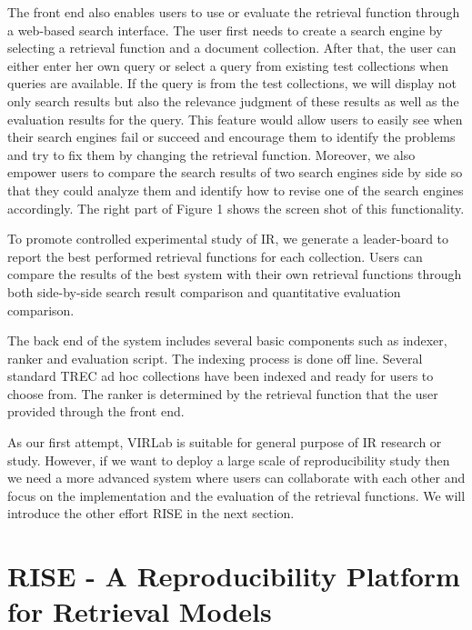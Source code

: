 The front end also enables users to use or evaluate the retrieval 
function through a web-based search interface. The user first needs 
to create a search engine by selecting a retrieval function and a 
document collection. After that, the user can either enter her 
own query or select a query from existing test collections when 
queries are available. If the query is from the test collections, 
we will display not only search results but also the relevance 
judgment of these results as well as the evaluation results for 
the query. This feature would allow users to easily see when their 
search engines fail or succeed and encourage them to identify the 
problems and try to fix them by changing the retrieval function. 
Moreover, we also empower users to compare the search results
of two search engines side by side so that they could analyze
them and identify how to revise one of the search engines
accordingly. The right part of Figure 1 shows the screen shot
of this functionality.

To promote controlled experimental study of IR, we generate a 
leader-board to report the best performed retrieval
functions for each collection. Users can compare the results
of the best system with their own retrieval functions through
both side-by-side search result comparison and quantitative
evaluation comparison.

The back end of the system includes several basic components 
such as indexer, ranker and evaluation script. The
indexing process is done off line. Several standard TREC
ad hoc collections have been indexed and ready for users
to choose from. The ranker is determined by the retrieval
function that the user provided through the front end.

As our first attempt, VIRLab is suitable for general purpose 
of IR research or study. However, if we want to deploy a 
large scale of reproducibility study then we need a more 
advanced system where users can collaborate with each other 
and focus on the implementation and the evaluation of the 
retrieval functions. We will introduce the other effort 
RISE in the next section.


\section{RISE - A Reproducibility Platform for Retrieval Models} 
\label{sec:system}

